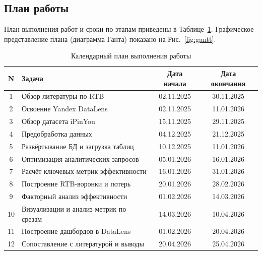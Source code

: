 \subsection{План работы}

План выполнения работ и сроки по этапам приведены в Таблице~\ref{tab:work_plan}.
Графическое представление плана (диаграмма Ганта) показано на Рис.~\ref{fig:gantt}.

\begin{table}[h!]
  \begin{center}
    \caption{Календарный план выполнения работы}
    \label{tab:work_plan}
    \renewcommand{\arraystretch}{1.15}
    \begin{tabular}{c|p{6.8cm}|c|c}
      \textbf{N} & \textbf{Задача} & \textbf{Дата начала} & \textbf{Дата окончания} \\
      \hline
      1  & Обзор литературы по RTB & 02.11.2025 & 30.11.2025 \\
      2  & Освоение Yandex DataLens & 02.11.2025 & 11.01.2026 \\
      3  & Обзор датасета iPinYou & 15.11.2025 & 29.11.2025 \\
      4  & Предобработка данных & 04.12.2025 & 21.12.2025 \\
      5  & Развёртывание БД и загрузка таблиц & 10.12.2025 & 11.01.2026 \\
      6  & Оптимизация аналитических запросов & 05.01.2026 & 16.01.2026 \\
      7  & Расчёт ключевых метрик эффективности & 16.01.2026 & 31.01.2026 \\
      8  & Построение RTB-воронки и потерь & 20.01.2026 & 28.02.2026 \\
      9  & Факторный анализ эффективности & 01.02.2026 & 14.03.2026 \\
      10 & Визуализации и анализ метрик по срезам & 14.03.2026 & 10.04.2026 \\
      11 & Построение дашбордов в DataLens & 01.02.2026 & 20.04.2026 \\
      12 & Сопоставление с литературой и выводы & 20.04.2026 & 25.04.2026 \\
    \end{tabular}
  \end{center}
\end{table}


